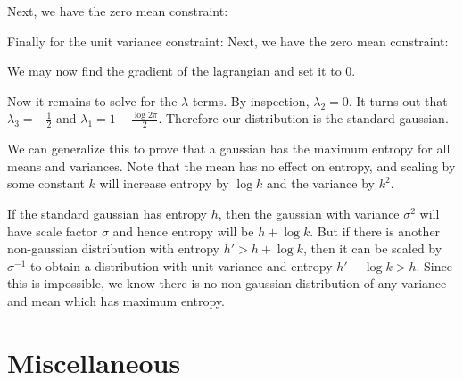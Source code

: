 \documentclass[12pt]{article}
\begin{document}
Next, we have the zero mean constraint:

Finally for the unit variance constraint:
Next, we have the zero mean constraint:

We may now find the gradient of the lagrangian and set it to 0.

Now it remains to solve for the $\lambda$ terms. By inspection, $\lambda_2 = 0$. It turns out that $\lambda_3 = -\frac{1}{2}$ and $\lambda_1 = 1-\frac{\log 2 \pi}{2}$. Therefore our distribution is the standard gaussian.

We can generalize this to prove that a gaussian has the maximum entropy for all means and variances. Note that the mean has no effect on entropy, and scaling by some constant $k$ will increase entropy by $\log k$ and the variance by $k^2$.

If the standard gaussian has entropy $h$, then the gaussian with variance $\sigma^2$ will have scale factor $\sigma$ and hence entropy will be $h+\log k$. But if there is another non-gaussian distribution with entropy $h' > h+\log k$, then it can be scaled by $\sigma^{-1}$ to obtain a distribution with unit variance and entropy $h' - \log k > h$. Since this is impossible, we know there is no non-gaussian distribution of any variance and mean which has maximum entropy.

\section{Miscellaneous}
\end{document}
